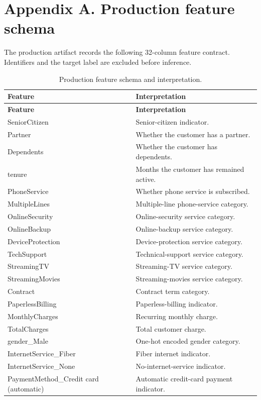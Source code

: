 \documentclass[9pt]{article}
\begin{document}
\section*{Appendix A. Production feature schema}
The production artifact records the following 32-column feature contract. Identifiers and the target label are excluded before inference.

\small
\begin{longtable}{p{}p{}}
\caption{Production feature schema and interpretation.}\label{tab:features}\\
\toprule
\textbf{Feature} & \textbf{Interpretation}\\
\midrule
\endfirsthead
\toprule
\textbf{Feature} & \textbf{Interpretation}\\
\midrule
\endhead
\bottomrule
\endfoot
SeniorCitizen & Senior-citizen indicator.\\
Partner & Whether the customer has a partner.\\
Dependents & Whether the customer has dependents.\\
tenure & Months the customer has remained active.\\
PhoneService & Whether phone service is subscribed.\\
MultipleLines & Multiple-line phone-service category.\\
OnlineSecurity & Online-security service category.\\
OnlineBackup & Online-backup service category.\\
DeviceProtection & Device-protection service category.\\
TechSupport & Technical-support service category.\\
StreamingTV & Streaming-TV service category.\\
StreamingMovies & Streaming-movies service category.\\
Contract & Contract term category.\\
PaperlessBilling & Paperless-billing indicator.\\
MonthlyCharges & Recurring monthly charge.\\
TotalCharges & Total customer charge.\\
gender\_Male & One-hot encoded gender category.\\
InternetService\_Fiber & Fiber internet indicator.\\
InternetService\_None & No-internet-service indicator.\\
PaymentMethod\_Credit card (automatic) & Automatic credit-card payment indicator.\\

\end{longtable}
\end{document}
